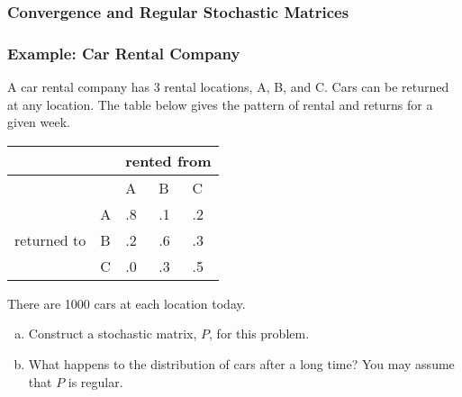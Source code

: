 \begin{frame}\frametitle{Convergence and Regular Stochastic Matrices}

    \begin{center}\end{center}

\end{frame}


\begin{frame}\frametitle{Example: Car Rental Company}

    A car rental company has 3 rental locations, A, B, and C. Cars can be returned at any location. The table below gives the pattern of rental and returns for a given week.
    
    \begin{table}[]
    \centering
    \label{my-label}
    \begin{tabular}{lllll}
                      &  & \multicolumn{3}{l}{rented from} \\\hline
                      &  & A & B & C \\\hline
    \multirow{3}{*}{returned to} & A & .8 & .1  & .2  \\
                      & B & .2 & .6 & .3     \\
                      & C & .0 & .3 & .5   \\\hline
    \end{tabular}
    \end{table}
        
     There are 1000 cars at each location today. 
     \begin{enumerate}[a)]
        \item Construct a stochastic matrix, $P$, for this problem.
        \item What happens to the distribution of cars after a long time? You may assume that $P$ is regular. 
     \end{enumerate}

\end{frame}




